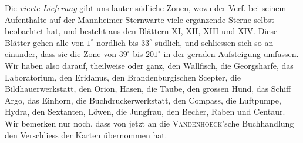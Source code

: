 Die \emph{vierte Lieferung} gibt uns lauter südliche Zonen, wozu der Verf. bei seinem Aufenthalte auf der Mannheimer Sternwarte viele ergänzende Sterne selbst beobachtet hat, und besteht aus den Blättern XI, XII, XIII und XIV. Diese Blätter gehen alle von $1^\circ$ nordlich bis $33^\circ$ südlich, und schliessen sich so an einander, dass sie die Zone von $39^\circ$ bis $201^\circ$ in der geraden Aufsteigung umfassen. Wir haben also darauf, theilweise oder ganz, den Wallfisch, die Georgsharfe, das Laboratorium, den Eridanus, den Brandenburgischen Scepter, die Bildhauerwerkstatt, den Orion, Hasen, die Taube, den grossen Hund, das Schiff Argo, das Einhorn, die Buchdruckerwerkstatt, den Compass, die Luftpumpe, Hydra, den Sextanten, Löwen, die Jungfrau, den Becher, Raben und Centaur. Wir bemerken nur noch, dass von jetzt an die \textsc{Vandenhoeck}'sche Buchhandlung den Verschliess der Karten übernommen hat.
